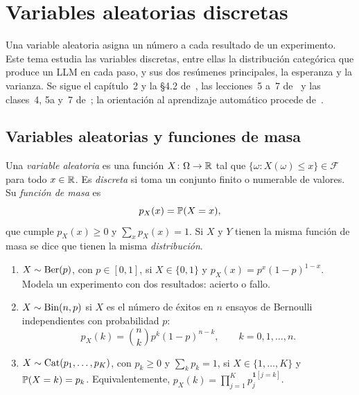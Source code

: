 \chapter{Variables aleatorias discretas}
\label{tema:2}

Una variable aleatoria asigna un número a cada resultado de un experimento. Este tema estudia las variables discretas, entre ellas la distribución categórica que produce un LLM en cada paso, y sus dos resúmenes principales, la esperanza y la varianza. Se sigue el capítulo~2 y la §4.2 de~\cite{bt}, las lecciones~5 a~7 de~\cite{mit6041} y las clases~4, 5a y~7 de~\cite{mit1805}; la orientación al aprendizaje automático procede de~\cite[§6.2 y §6.4]{mml}.

\section{Variables aleatorias y funciones de masa}

\begin{definicion}\label{def:va}
Una \emph{variable aleatoria} es una función $X\colon\Omega\to\mathbb{R}$ tal que $\{\omega: X(\omega)\le x\}\in\mathcal{F}$ para todo $x\in\mathbb{R}$. Es \emph{discreta} si toma un conjunto finito o numerable de valores. Su \emph{función de masa} es
\[
p_X(x)=\mathbb{P}(X=x),
\]
que cumple $p_X(x)\ge 0$ y $\sum_x p_X(x)=1$. Si $X$ y $Y$ tienen la misma función de masa se dice que tienen la misma \emph{distribución}.
\end{definicion}

\begin{definicion}\label{def:discretas}
\begin{enumerate}
  \item $X\sim\operatorname{Ber}(p)$, con $p\in[0,1]$, si $X\in\{0,1\}$ y $p_X(x)=p^{x}(1-p)^{1-x}$. Modela un experimento con dos resultados: acierto o fallo.
  \item $X\sim\operatorname{Bin}(n,p)$ si $X$ es el número de éxitos en $n$ ensayos de Bernoulli independientes con probabilidad $p$:
  \[
  p_X(k)=\binom{n}{k}p^{k}(1-p)^{n-k},\qquad k=0,1,\dots,n.
  \]
  \item $X\sim\operatorname{Cat}(p_1,\dots,p_K)$, con $p_k\ge 0$ y $\sum_k p_k=1$, si $X\in\{1,\dots,K\}$ y $\mathbb{P}(X=k)=p_k$. Equivalentemente, $p_X(k)=\prod_{j=1}^{K}p_j^{\mathbf{1}[j=k]}$.
\end{enumerate}
\end{definicion}

